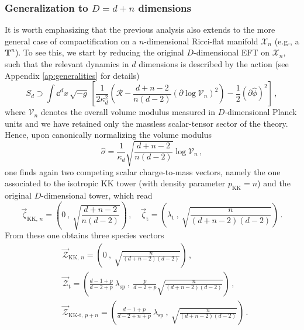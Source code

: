 \subsubsection*{Generalization to $D=d+n$ dimensions}

It is worth emphasizing that the previous analysis also extends to the more general case of compactification on a $n$-dimensional Ricci-flat manifold $\mathcal{X}_n$ (e.g., a $\mathbf{T}^n$). To see this, we start by reducing the original $D$-dimensional EFT on $\mathcal{X}_n$, such that the relevant dynamics in $d$ dimensions is described by the action (see Appendix \ref{ap:generalities} for details)
%
\begin{equation}
	S_{d} \supset \int \dd^{d}x\, \sqrt{-g}\,  \left[ \frac{1}{2\kappa_{d}^2} \left(\mathcal{R} - \frac{d+n-2}{n (d-2)} \left(\partial \log \mathcal{V}_n \right)^2 \right)- \frac{1}{2} \left(\partial \hat \phi \right)^2 \right]\, ,
\end{equation}
%
where $\mathcal{V}_n$ denotes the overall volume modulus measured in $D$-dimensional Planck units and we have retained only the massless scalar-tensor sector of the theory. Hence, upon canonically normalizing the volume modulus
%
\begin{equation}
	\hat \sigma = \frac{1}{\kappa_d}\sqrt{\frac{d+n-2}{n(d-2)}} \log \mathcal{V}_n\, ,
\end{equation}
%
one finds again two competing scalar charge-to-mass vectors, namely the one associated to the isotropic KK tower (with density parameter $p_{\text{KK}}=n$) and the original $D$-dimensional tower, which read
%
\begin{equation}\label{eq:zvectornmfd}
	\vec{\zeta}_{\text{KK},\, n} = \left( 0 \ ,\ \sqrt{\frac{d+n-2}{n(d-2)}} \right) \, , \quad \vec{\zeta}_{\text{t}} = \left( \lambda_{\text{t}} \ ,\ \sqrt{\frac{n}{(d+n-2)(d-2)}} \right) \, .
\end{equation}
%
From these one obtains three species vectors
%
\begin{equation}
\label{eq:Zspeciescompactification}
\begin{split} 
	&\vec{\mathcal{Z}}_{\text{KK},\, n} = \left( 0 \ ,\ \sqrt{\frac{n}{(d+n-2)(d-2)}} \right) \, ,\\
	&\vec{\mathcal{Z}}_{\text{t}} = \left( \frac{d-1+p}{d-2+p} \ \lambda_{\text{sp}} \ ,\ \frac{p}{d-2+p} \sqrt{\frac{n}{(d+n-2)(d-2)}} \right) \, ,\\
	&\vec{\mathcal{Z}}_{\text{KK-t},\, p+n}  = \left( \frac{d-1+p}{d-2+n+p} \ \lambda_{\text{sp}} \ ,\ \sqrt{\frac{n}{(d+n-2)(d-2)}} \right) \, .
\end{split}
\end{equation}
